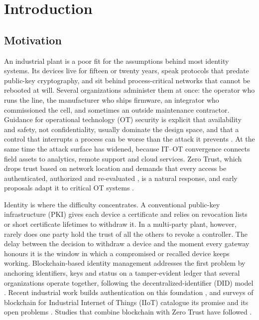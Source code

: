 \section{Introduction}\label{sec:intro}

\subsection{Motivation}
An industrial plant is a poor fit for the assumptions behind most identity systems. Its devices live for fifteen or twenty years, speak protocols that predate public-key cryptography, and sit behind process-critical networks that cannot be rebooted at will. Several organizations administer them at once: the operator who runs the line, the manufacturer who ships firmware, an integrator who commissioned the cell, and sometimes an outside maintenance contractor. Guidance for operational technology (OT) security is explicit that availability and safety, not confidentiality, usually dominate the design space, and that a control that interrupts a process can be worse than the attack it prevents \cite{stouffer2023sp80082}. At the same time the attack surface has widened, because IT--OT convergence connects field assets to analytics, remote support and cloud services. Zero Trust, which drops trust based on network location and demands that every access be authenticated, authorized and re-evaluated \cite{nist800207,fernandez2024critical,phiayura2023comprehensive}, is a natural response, and early proposals adapt it to critical OT systems \cite{song2025ztot,zanasi2024flexible}.

Identity is where the difficulty concentrates. A conventional public-key infrastructure (PKI) gives each device a certificate and relies on revocation lists or short certificate lifetimes to withdraw it. In a multi-party plant, however, rarely does one party hold the trust of all the others to revoke a controller. The delay between the decision to withdraw a device and the moment every gateway honours it is the window in which a compromised or recalled device keeps working. Blockchain-based identity management addresses the first problem by anchoring identifiers, keys and status on a tamper-evident ledger that several organizations operate together, following the decentralized-identifier (DID) model \cite{w3cdid2022,hosseini2023blockchain,aguru2025ssi,folino2025puf}. Recent industrial work builds authentication on this foundation \cite{zhai2025chebyshev}, and surveys of blockchain for Industrial Internet of Things (IIoT) catalogue its promise and its open problems \cite{essaid2025iiotbc}. Studies that combine blockchain with Zero Trust have followed \cite{liu2024dissecting,nie2025zeroTrust,salim2026ztblociot,mukta2026ztdelegation,jamwal2026survey,farhan2026ztfsf,potturi2026hybrid}.

